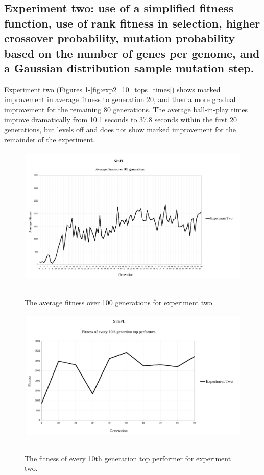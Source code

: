 \subsection[Experiment Two]{Experiment two: use of a simplified fitness function, use of rank fitness in selection, higher crossover probability, mutation probability based on the number of genes per genome, and a Gaussian distribution sample mutation step.}

Experiment two (Figures \ref{fig:exp2_avg_fit}-\ref{fig:exp2_10_tops_times}) shows marked improvement in average fitness to generation 20, and then a more gradual improvement for the remaining 80 generations. The average ball-in-play times improve dramatically from 10.1 seconds to 37.8 seconds within the first 20 generations, but levels off and does not show marked improvement for the remainder of the experiment.

\begin{figure}[ht!]  
  \centering
  \includegraphics[width=5in]{../Figures/Chapter3/exp2_avg_fit.png}
  \rule{35em}{0.5pt}
  \caption[Experiment Two Average Fitness]{The average fitness over 100 generations for experiment two.}
  \label{fig:exp2_avg_fit}
\end{figure}

\begin{figure}[ht!]  
  \centering
  \includegraphics[width=5in]{../Figures/Chapter3/exp2_10_tops.png}
  \rule{35em}{0.5pt}
  \caption[Experiment Two Top Performers]{The fitness of every 10th generation top performer for experiment two.}
  \label{fig:exp2_10_tops}
\end{figure}

